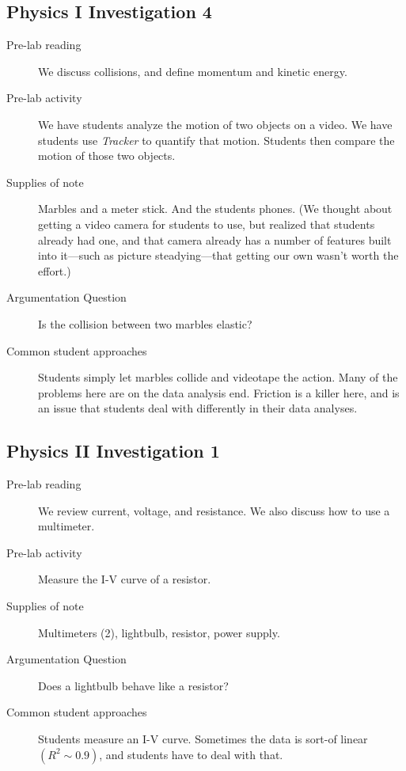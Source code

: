 \documentclass[aip, numerical, preprint]{revtex4-2}
\begin{document}
\subsection{Physics \textrm{I} Investigation 4}
\begin{description}
  \item[Pre-lab reading] We discuss collisions, and define momentum and kinetic energy.
  \item[Pre-lab activity] We have students analyze the motion of two objects on a video.  We
  have students use \textit{Tracker}\citep{bro2009} to quantify that motion.  Students then
  compare the motion of those two objects.
  \item[Supplies of note] Marbles and a meter stick.  And the students phones.  (We thought
  about getting a video camera for students to use, but realized that students already had one,
  and that camera already has a number of features built into it---such as picture
  steadying---that getting our own wasn't worth the effort.)
  \item[Argumentation Question] Is the collision between two marbles elastic?
  \item[Common student approaches] Students simply let marbles collide and videotape the
  action. Many of the problems here are on the data analysis end.  Friction is a killer here,
  and is an issue that students deal with differently in their data analyses.
\end{description}

\subsection{Physics \textrm{II} Investigation 1}
\begin{description}
  \item[Pre-lab reading] We review current, voltage, and resistance.  We also discuss how to
  use a multimeter.
  \item[Pre-lab activity] Measure the I-V curve of a resistor.
  \item[Supplies of note] Multimeters (2), lightbulb, resistor, power supply.
  \item[Argumentation Question] Does a lightbulb behave like a resistor?
  \item[Common student approaches] Students measure an I-V curve.  Sometimes the data is
  sort-of linear $(R^2\sim 0.9)$, and students have to deal with that.
\end{description}
\end{document}
